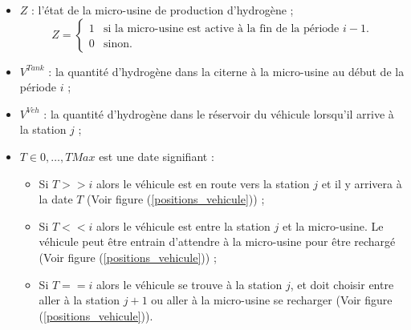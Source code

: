 \begin{itemize}[label=$\square$]
	\item $Z$ : l'état de la micro-usine de production d'hydrogène ;
	$$
	Z= \left\{
	\begin{array}{ll}
	1 & \mbox{si la micro-usine est active à la fin de la période $i-1$.} \\
	0 & \mbox{sinon.}
	\end{array}
	\right.
	$$
	\item $V^{Tank} $ : la quantité d'hydrogène dans la citerne à la micro-usine au début de la période $i$ ;
	
	\item $V^{Veh} $ : la quantité d'hydrogène dans le réservoir du véhicule lorsqu'il arrive à la station $j$ ;
	
	\item $T \in 0, \dots, TMax$ est une date signifiant :
	\begin{itemize}
		\item Si $T >> i$ alors le véhicule est en route vers la station $j$ et il y arrivera à la date $T$ (Voir figure (\ref{positions_vehicule})) ;
		\item Si $T<<i$ alors le véhicule est entre la station $j$ et la micro-usine. Le véhicule peut être entrain d'attendre à la micro-usine pour être rechargé (Voir figure (\ref{positions_vehicule})) ;
		\item Si $T==i$ alors le véhicule se trouve à la station $j$, et doit choisir entre aller à la station $j+1$ ou aller à la micro-usine se recharger (Voir figure (\ref{positions_vehicule})).
	\end{itemize}
\end{itemize}

